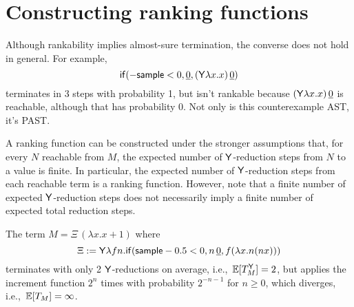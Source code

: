 \section{Constructing ranking functions}
\label{sec:ranking}

Although rankability implies almost-sure termination, the converse does not hold in general. For example,
\begin{equation}
\tif{{-}\tsample < 0}{\underline{0}}{(\tY \lambda x. x) \, \underline 0}
\label{ex:0 probability reachable}
\end{equation}
terminates in 3 steps with probability 1, but isn't rankable because $(\mathsf{Y} \lambda x. x) \, \underline 0$ is reachable, although that has probability 0. 
Not only is this counterexample AST, it's PAST. %

A ranking function can be constructed under the stronger assumptions that, for every $N$ reachable from $M$, the expected number of $\mathsf{Y}$-reduction steps from $N$ to a value is finite. 
In particular, the expected number of $\mathsf{Y}$-reduction steps from each reachable term is a ranking function. 
However, note that a finite number of expected $\mathsf{Y}$-reduction steps does not necessarily imply a finite number of expected total reduction steps.

\begin{example}
\label{ex:tY finite does not imply t finite}
The term $M = \Xi \, (\lambda x. x+1)$ where
\[
\Xi := \mathsf{Y} \lambda f n. \mathsf{if}(\mathsf{sample} - 0.5 < 0, n \, \underline 0, f (\lambda x. n (n x)))
\] 
terminates with only 2 $\mathsf{Y}$-reductions on average, i.e.,~$\mathbb{E}[T_M^{\mathsf{Y}}] = 2$, but applies the increment function $2^n$ times with probability $2^{-n-1}$ for $n \geq 0$, which diverges, i.e.,~$\mathbb{E}[T_M] = \infty$.
\end{example}

